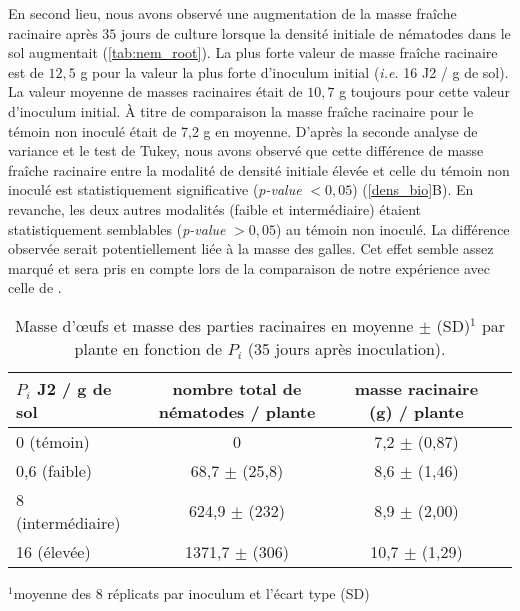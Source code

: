 	En second lieu, nous avons observé une augmentation de la masse fraîche racinaire après $35$ jours de culture lorsque  la densité initiale de nématodes dans le sol augmentait (\autoref{tab:nem_root}). La plus forte  valeur  de masse fraîche racinaire est de $12,5$ g pour la valeur la plus forte  d'inoculum initial (\textit{i.e.} 16 J2 / g de sol). La valeur moyenne de masses racinaires était de $10,7$ g toujours pour cette valeur d'inoculum initial. À titre de comparaison la masse fraîche racinaire pour le témoin non inoculé était de 7,2 g en moyenne.
	 D’après la seconde analyse de variance et  le test de Tukey, nous avons observé que cette différence de masse fraîche racinaire   entre la modalité de densité initiale élevée et  celle du  témoin non inoculé est statistiquement significative (\textit{p-value} $< 0,05$)  (\autoref{dens_bio}B).  En revanche, les deux autres modalités (faible et intermédiaire) étaient statistiquement semblables (\textit{p-value} $> 0,05$) au témoin non inoculé.  La différence observée serait potentiellement liée à la masse des galles. Cet effet semble assez marqué et sera pris en compte lors de la comparaison de notre expérience avec celle de \citet{Ehwaeti1998}. 
	 
	
	\begin{table}[ht]
	\centering
	\caption{  Masse d’œufs et  masse des parties racinaires en  moyenne  $\pm$ (SD)$^1$   par plante en fonction de $P_i$ (35 jours après inoculation).}
	  \begin{tabular}{lccc}
	\hline
	$P_i$ J2 / g de sol  & nombre total de nématodes / plante    &    masse racinaire (g) / plante  \\ \hline 	 
	0 (témoin)           & 0                                     &     7,2 $\pm$ (0,87)                                        \\
	0,6  (faible)                                                & 68,7 $\pm$ (25,8) &  8,6 $\pm$ (1,46)                                               \\
	8    (intermédiaire) & 624,9  $\pm$ (232)                    &  8,9 $\pm$ (2,00)                                      
\\
	16 (élevée)                                                  & 1371,7  $\pm$ (306)    &     10,7 $\pm$ (1,29)                                     \\ \hline
	\end{tabular}
	\label{tab:nem_root}
	  \par\medskip\footnotesize
	 ${}^1$moyenne des 8 réplicats par inoculum et  l'écart type (SD)
	\end{table}

